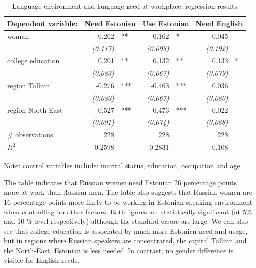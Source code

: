 \documentclass[12pt, a4paper]{article}
\newcommand{\std}[1]{\emph{(#1)}}
\begin{document}
\begin{table}[t]
	\centering
	\caption{Language environment and language need at workplace:
		regression results}
	\label{tab:environment_model}
	\begin{tabular}{l r@{}l r@{}l r@{}l}
		\toprule
		Dependent variable: & \multicolumn{2}{c}{Need Estonian} & \multicolumn{2}{c}{Use Estonian} & \multicolumn{2}{c}{Need English} \\ \midrule
		woman             & 0.262       & **  & 0.162       & *   & -0.045      &   \\
		                  & \std{0.117} &     & \std{0.095} &     & \std{0.192} &   \\
		college education & 0.201       & **  & 0.132       & **  & 0.133       & * \\
		                  & \std{0.083} &     & \std{0.067} &     & \std{0.079} &   \\
		region Tallinn    & -0.276      & *** & -0.463      & *** & 0.036       &   \\
		                  & \std{0.083} &     & \std{0.067} &     & \std{0.080} &   \\
		region North-East & -0.527      & *** & -0.473      & *** & 0.022       &   \\
		                  & \std{0.091} &     & \std{0.074} &     & \std{0.088} &   \\ \midrule
		\# observations             & 228         &     & 228         &     & 228         &   \\
		$R^{2}$           & 0.2598      &     & 0.2831      &     & 0.108       &   \\ \bottomrule
	\end{tabular}
	\begin{flushleft}
		Note: control variables include: marital status, education,
		occupation and age.
	\end{flushleft}
\end{table}

The table indicates that Russian women need Estonian 26 percentage
points more at work than Russian men.  The table also suggests that
Russian women are 16 percentage points more likely to be working in
Estonian-speaking environment when controlling for other factors.
Both figures are statistically significant (at 5\% and 10 \% level
respectively) although the standard errors are large.  We can also see that
college education is associated by much more Estonian need and usage,
but in regions where Russian speakers are concentrated, the capital
Tallinn and the North-East, Estonian is less needed.  In contrast, no
gender difference is visible for English needs.
\end{document}
